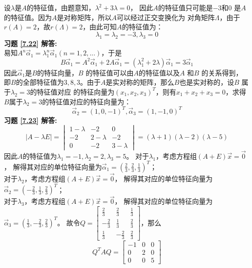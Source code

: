 设$\lambda$是$A$的特征值，由题意知，$\lambda^2+3\lambda=0$，
因此$A$的特征值只可能是$-3$和$0$ 是$A$ 的特征值。因为$A$是对称矩阵，所以$A$可以经过正交变换化为
对角矩阵$\Lambda$，由于$r(A)=2$，故$r(\Lambda)=2$，由此可知$A$的特征值为：
\begin{equation*}
  \lambda_1=\lambda_2=-3,\lambda_3=0
\end{equation*}
\textbf{习题 \ref{7.22} 解答:}\\
易知$A^n\vec{\alpha}_1=\lambda_1^n\vec{\alpha}_1(n=1,2,...)$，于是
\begin{equation*}
  B\vec{\alpha}_1=A^2\vec{\alpha}_1+2A\vec{\alpha}_1=(\lambda_1^2+2\lambda)\vec{\alpha}_1=3\vec{\alpha}_1
\end{equation*}
因此$\vec{\alpha}_1$是$B$的特征向量，$B$ 的特征值可以由$A$的特征值以及$A$ 和$B$ 的关系得到，
即$B$的全部特征值为$3,8,3$。由于$A$是实对称的矩阵，那么$B$也是实对称的，设$B$ 属于$\lambda_2=3$的特征值对应
的特征向量为$(x_1,x_2,x_3)^T$，则有$x_1+x_2+x_3=0$，求得$B$属于$\lambda_2=3$的特征值对应的特征向量为：
\begin{equation*}
  \vec{\alpha}_2=(1,0,-1)^T,\vec{\alpha}_3=(1,-1,0)^T
\end{equation*}
\textbf{习题 \ref{7.23} 解答:}\\
\begin{equation*}
 |A-\lambda E| = \begin{vmatrix}1-\lambda&-2&0\\-2&2-\lambda&-2\\0&-2&3-\lambda\end{vmatrix}
               =(\lambda+1)(\lambda-2)(\lambda-5)
\end{equation*}
因此$A$的特征值为$\lambda_1=-1,\lambda_2=2,\lambda_3=5$。
对于$\lambda_1$，考虑方程组$(A+E)\vec{x}=\vec{0}$，
解得其对应的单位特征向量为$\vec{\alpha}_1=(\frac{2}{3},\frac{2}{3},\frac{1}{3})^T$；\\
对于$\lambda_2$，考虑方程组$(A+E)\vec{x}=\vec{0}$，
解得其对应的单位特征向量为$\vec{\alpha}_2=(-\frac{2}{3},\frac{1}{3},\frac{2}{3})^T$；\\
对于$\lambda_3$，考虑方程组$(A+E)\vec{x}=\vec{0}$，
解得其对应的单位特征向量为$\vec{\alpha}_3=(\frac{1}{3},-\frac{2}{3},\frac{2}{3})^T$。
故令$Q=\begin{bmatrix}\frac{2}{3}&\frac{2}{3}&\frac{1}{3}\\-\frac{2}{3}&\frac{1}{3}&\frac{2}{3}\\
\frac{1}{3}&-\frac{2}{3}&\frac{2}{3}\end{bmatrix}$，那么
\begin{equation*}
  Q^TAQ=\begin{bmatrix}-1&0&0\\0&2&0\\0&0&5\end{bmatrix}
\end{equation*}
